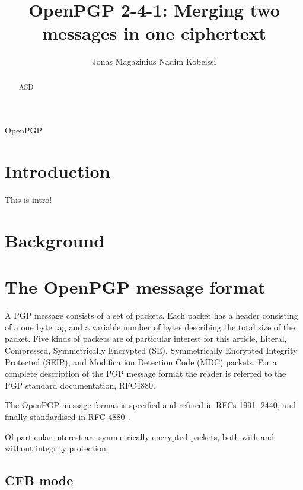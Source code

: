 \documentclass[runningheads,a4paper]{llncs}[2018/03/10]
\newif\ifanon
\begin{document}
\ifanon
\else
	\author{Jonas Magazinius Nadim Kobeissi}
\fi

\title{OpenPGP 2-4-1: Merging two messages in one ciphertext}
\maketitle

\begin{abstract}
	{ASD}
\end{abstract}

\begin{keywords}
	OpenPGP
\end{keywords}

\section{Introduction}\label{sec:intro}
This is intro!

\section{Background}\label{sec:background}


\section{The OpenPGP message format}\label{sec:openpgp}

A PGP message consists of a set of packets. Each packet has a header consisting 
of a one byte tag and a variable
number of bytes describing the total size of the packet. Five kinds of
packets are of particular interest for this article, Literal,
Compressed, Symmetrically Encrypted (SE), Symmetrically Encrypted
Integrity Protected (SEIP), and Modification Detection Code (MDC)
packets. For a complete description of the PGP message format the
reader is referred to the PGP standard documentation, RFC4880.

The OpenPGP message format is specified and refined in RFCs 1991,
2440, and finally standardised in RFC
4880~\cite{callas1998rfc,callas2007openpgp}.

Of particular interest are symmetrically encrypted packets, both with
and without integrity protection.

\subsection{CFB mode}
\end{document}
